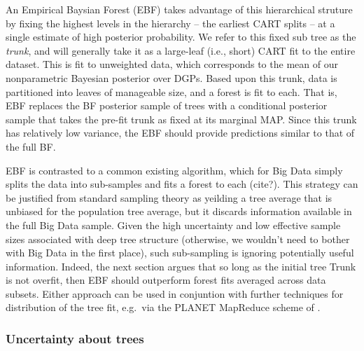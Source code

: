 \documentclass[12pt]{article}
\begin{document}
An Empirical Baysian Forest (EBF) takes advantage of this hierarchical
struture by fixing the highest levels in the hierarchy -- the earliest
CART splits -- at a single estimate of high posterior probability. We
refer to this fixed sub tree as the \emph{trunk}, and will generally
take it as a large-leaf (i.e., short) CART fit to the entire dataset.
This is fit to unweighted data, which corresponds to the mean of our
nonparametric Bayesian posterior over DGPs. Based upon this trunk, data
is partitioned into leaves of manageable size, and a forest is fit to
each. That is, EBF replaces the BF posterior sample of trees with a
conditional posterior sample that takes the pre-fit trunk as fixed at
its marginal MAP. Since this trunk has relatively low variance, the EBF
should provide predictions similar to that of the full BF.

EBF is contrasted to a common existing algorithm, which for Big Data
simply splits the data into sub-samples and fits a forest to each
(cite?). This strategy can be justified from standard sampling theory as
yeilding a tree average that is unbiased for the population tree
average, but it discards information available in the full Big Data
sample. Given the high uncertainty and low effective sample sizes
associated with deep tree structure (otherwise, we wouldn't need to
bother with Big Data in the first place), such sub-sampling is ignoring
potentially useful information. Indeed, the next section argues that so
long as the initial tree Trunk is not overfit, then EBF should
outperform forest fits averaged across data subsets. Either approach can
be used in conjuntion with further techniques for distribution of the
tree fit, e.g.~via the PLANET MapReduce scheme of
\cite{panda_planet:_2009}.

    \subsubsection{Uncertainty about trees}\label{uncertainty-about-trees}
\end{document}
